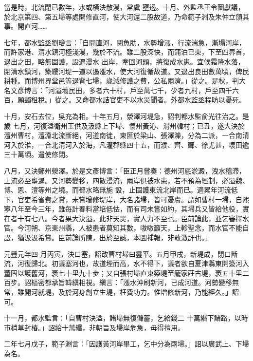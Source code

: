\begin{pinyinscope}
 當是時，北流閉已數年，水或橫決散漫，常虞
 壅遏。十月、外監丞王令圖獻議，於北京第四、第五埽等處開修直河，使大河還二股故道，乃命範子淵及朱仲立領其事。開直河……



 七年，都水監丞劉璯言：「自開直河，閉魚肋，水勢增漲，行流湍急，漸塌河岸，而許家港、清水鎮河極淺漫，幾於不流。雖二股深快，而蒲泊已東，下至四界首，退出之田，略無固護，設遇漫水
 出岸，牽回河頭，將復成水患。宜候霜降水落，閉清水鎮河，築縷河堤一道以遏漲水，使大河復循故道。又退出良田數萬頃，俾民耕種。而博州界堂邑等退背七埽，歲減修護之費，公私兩濟。」從之。是秋，判大名文彥博言：「河溢壞民田，多者六十村，戶至萬七千，少者九村，戶至四千六百，願蠲租稅。」從之。又命都水詰官吏不以水災聞者。外都水監丞程昉以憂死。



 十月，安石去位，吳充為相。十年五月，滎澤河堤急，詔判都水監俞光往治之。是歲
 七月，河復溢衛州王供及汲縣上下埽、懷州黃沁、滑州韓村；已丑，遂大決於澶州曹村，澶淵北流斷絕，河道南徙，東匯於梁山、張澤濼，分為二派，一合南清河入於淮，一合北清河入於海，凡灌郡縣四十五，而濮、齊、鄆、徐尤甚，壞田逾三十萬頃。遣使修閉。



 八月，又決鄭州滎澤。於是文彥博言：「臣正月嘗奏：德州河底淤澱，洩水稽滯，上流必至壅遏。又河勢變移，四散漫流，兩岸俱被水患，若不預為經制，必溢魏、博、恩、澶等州之境。而都水略無施
 設，止固護東流北岸而已。適累年河流低下，官吏希省費之賞，未嘗增修堤岸，大名諸埽，皆可憂虞。謂如曹村一埽，自熙寧八年至今三年，雖每計春料當培低怯，而有司未嘗如約，其埽兵又皆給他役，實在者十有七八。今者果大決溢，此非天災，實人力不至也。臣前論此，並乞審擇水官。今河朔、京東州縣，人被患者莫知其數，嗷嗷籲天，上軫聖念，而水官不能自訟，猶汲汲希賞。臣前論所陳，出於至誠，本圖補報，非敢激訐也。」



 元豐元年四
 月丙寅，決口塞，詔改曹村埽曰靈平。五月甲戌，新堤成，閉口斷流，河復歸北。初議塞河也，故道堙而高，水不得下，議者欲自夏津縣東開簽河入董固以護舊河，袤七十里九十步；又自張村埽直東築堤至龐家莊古堤，袤五十里二百步。詔樞密都承旨韓縝相視。縝言：「漲水沖刷新河，已成河道。河勢變移無常，雖開河就堤，及於河身創立生堤，枉費功力。惟增修新河，乃能經久。」詔可。



 十一月，都水監言：「自曹村決溢，諸埽無復儲蓄，乞給錢二
 十萬緡下諸路，以時市梢草封樁。」詔給十萬緡，非朝旨及埽岸危急，毋得擅用。



 二年七月戊子，範子淵言：「因護黃河岸畢工，乞中分為兩埽。」詔以廣武上、下埽為名。




\end{pinyinscope}
